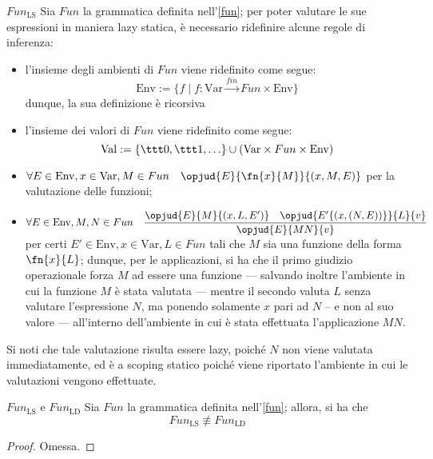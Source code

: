 \documentclass[a4paper, 12pt]{report}
\begin{document}
    \begin{framedprop}{$Fun_\mathrm{LS}$}
        Sia $Fun$ la grammatica definita nell'\cref{fun}; per poter valutare le sue espressioni in maniera lazy statica, è necessario ridefinire alcune regole di inferenza:

        \begin{itemize}
            \item l'insieme degli ambienti di $Fun$ viene ridefinito come segue: $$\mathrm{Env} := \{f \mid f :\mathrm{Var} \xrightarrow{fin} Fun \times \mathrm{Env}\}$$ dunque, la sua definizione è ricorsiva
            \item l'insieme dei valori di $Fun$ viene ridefinito come segue: $$\mathrm{Val} := \{\ttt 0, \ttt 1, \ldots\} \cup (\mathrm{Var} \times Fun \times \mathrm{Env})$$
            \item $\forall E \in \mathrm{Env}, x \in \mathrm{Var}, M \in Fun \quad \opjud{E}{\fn{x}{M}}{(x,M,E)}$ per la valutazione delle funzioni;
            \item $\forall E \in \mathrm{Env}, M,N \in Fun \quad \dfrac{\opjud{E}{M}{(x,L,E')} \quad \opjud{E'\{(x,(N,E))\}}{L}{v}}{\opjud{E}{MN}{v}}$ per certi $E' \in \mathrm{Env}, x \in \mathrm{Var}, L \in Fun$ tali che $M$ sia una funzione della forma $\fn{x}{L}$; dunque, per le applicazioni, si ha che il primo giudizio operazionale forza $M$ ad essere una funzione --- salvando inoltre l'ambiente in cui la funzione $M$ è stata valutata --- mentre il secondo valuta $L$ senza valutare l'espressione $N$, ma ponendo solamente $x$ pari ad $N$ -- e non al suo valore --- all'interno dell'ambiente in cui è stata effettuata l'applicazione $MN$.
        \end{itemize}

        Si noti che tale valutazione risulta essere lazy, poiché $N$ non viene valutata immediatamente, ed è a scoping statico poiché viene riportato l'ambiente in cui le valutazioni vengono effettuate.
    \end{framedprop}

    \begin{framedlem}[label={fun lemma pt2}]{$Fun_\mathrm{LS}$ e $Fun_\mathrm{LD}$}
        Sia $Fun$ la grammatica definita nell'\cref{fun}; allora, si ha che $$Fun_\mathrm{LS} \not\equiv Fun_\mathrm{LD}$$
    \end{framedlem}

    \begin{proof}
        Omessa.
    \end{proof}
\end{document}
